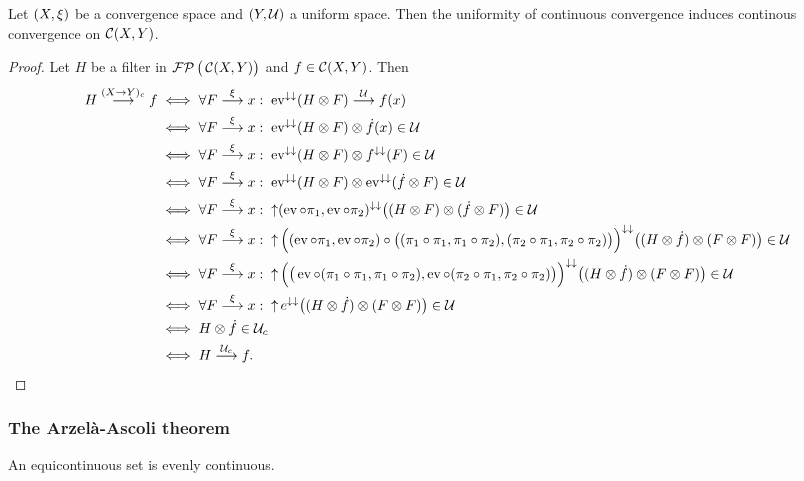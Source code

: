 \begin{lemma}
Let $\left( X, \xi \right)$ be a convergence space and $\left( Y, \mathcal{U} \right)$ a uniform space. Then the uniformity of continuous convergence induces continous convergence on $\operatorname{\mathcal{C}}(X,Y)$.
\end{lemma}
\begin{proof}
Let $H$ be a filter in $\operatorname{\mathcal{FP}}\big(\operatorname{\mathcal{C}}(X,Y)\big)$ and $f\in \operatorname{\mathcal{C}}(X, Y)$. Then
\begin{align*}
H\overset{(X\to Y)_c}{\longrightarrow} f &\iff \forall F\overset{\xi}{\longrightarrow}x: \; \operatorname{ev}^{\downarrow\downarrow}(H\otimes F) \overset{\mathcal{U}}{\longrightarrow} f(x) \\
&\iff \forall F\overset{\xi}{\longrightarrow}x: \; \operatorname{ev}^{\downarrow\downarrow}(H\otimes F)\otimes \dot{f}(x) \in\mathcal{U} \\
&\iff \forall F\overset{\xi}{\longrightarrow}x: \; \operatorname{ev}^{\downarrow\downarrow}(H\otimes F)\otimes f^{\downarrow\downarrow}(F) \in\mathcal{U} \\
&\iff \forall F\overset{\xi}{\longrightarrow}x: \; \operatorname{ev}^{\downarrow\downarrow}(H\otimes F)\otimes \operatorname{ev}^{\downarrow\downarrow}(\dot{f}\otimes F) \in\mathcal{U} \\
&\iff \forall F\overset{\xi}{\longrightarrow}x: \; \operatorname{\uparrow}(\operatorname{ev}\circ \pi_1, \operatorname{ev}\circ\pi_2)^{\downarrow\downarrow}\big((H\otimes F)\otimes(\dot{f}\otimes F)\big) \in\mathcal{U} \\
&\iff \forall F\overset{\xi}{\longrightarrow}x: \; \operatorname{\uparrow}\Big((\operatorname{ev}\circ \pi_1, \operatorname{ev}\circ\pi_2)\circ \big((\pi_1\circ\pi_1, \pi_1\circ\pi_2),(\pi_2\circ\pi_1, \pi_2\circ\pi_2)\big)\Big)^{\downarrow\downarrow}\big((H\otimes \dot{f})\otimes(F\otimes F)\big) \in\mathcal{U} \\
&\iff \forall F\overset{\xi}{\longrightarrow}x: \; \operatorname{\uparrow}\Big(\big(\operatorname{ev}\circ (\pi_1\circ\pi_1, \pi_1\circ\pi_2), \operatorname{ev}\circ(\pi_2\circ\pi_1, \pi_2\circ\pi_2)\big)\Big)^{\downarrow\downarrow}\big((H\otimes \dot{f})\otimes(F\otimes F)\big) \in\mathcal{U} \\
&\iff \forall F\overset{\xi}{\longrightarrow}x: \; \operatorname{\uparrow} e^{\downarrow\downarrow}\big((H\otimes \dot{f})\otimes(F\otimes F)\big) \in\mathcal{U} \\
&\iff H\otimes \dot{f}\in \mathcal{U}_c \\
&\iff H\overset{\mathcal{U}_c}{\longrightarrow} f.
\end{align*}
\end{proof}

\subsubsection{The Arzelà-Ascoli theorem}
\begin{proposition}
An equicontinuous set is evenly continuous.
\end{proposition}


